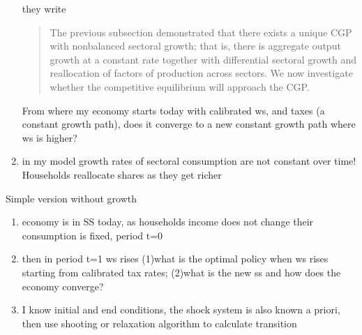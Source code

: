 \begin{enumerate}
	they write \begin{quote}
		The previous subsection demonstrated that there exists a unique CGP with  nonbalanced  sectoral  growth;  that  is,  there  is  aggregate  output growth at a constant rate together with differential sectoral growth and reallocation of factors of production across sectors. We now investigate whether the competitive equilibrium will approach the CGP. 
	\end{quote} 
\ar From where my economy starts today with calibrated ws, and taxes (a constant growth path), does it converge to a new constant growth path where ws is higher? 
\item in my model growth rates of sectoral consumption are not constant over time! Households reallocate shares as they get richer
\end{enumerate}

Simple version without growth
\begin{enumerate}
	\item economy is in SS today, as households income does not change their consumption is fixed, period t=0
	\item then in period t=1 ws rises (1)\ar what is the optimal policy when ws rises starting from calibrated tax rates; (2)\ar what is the new ss and how does the economy converge?
	\item[\ar] I know initial and end conditions, the shock system is also known a priori, then use shooting or relaxation algorithm to calculate transition
\end{enumerate}